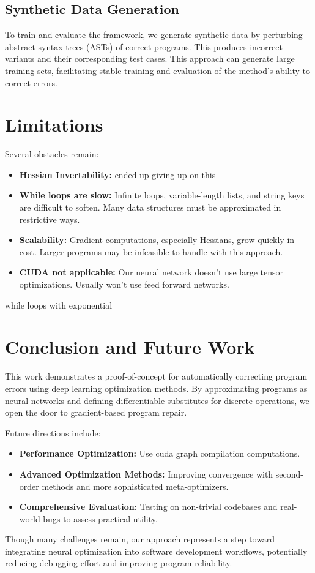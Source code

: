 \documentclass{article}
\begin{document}
\subsection{Synthetic Data Generation}
To train and evaluate the framework, we generate synthetic data by perturbing abstract syntax trees (ASTs) of correct programs. This produces incorrect variants and their corresponding test cases. This approach can generate large training sets, facilitating stable training and evaluation of the method’s ability to correct errors.


\section{Limitations}
Several obstacles remain:
\begin{itemize}
    \item \textbf{Hessian Invertability:} ended up giving up on this
    \item \textbf{While loops are slow:} Infinite loops, variable-length lists, and string keys are difficult to soften. Many data structures must be approximated in restrictive ways.
    \item \textbf{Scalability:} Gradient computations, especially Hessians, grow quickly in cost. Larger programs may be infeasible to handle with this approach.
    \item \textbf{CUDA not applicable:} Our neural network doesn't use large tensor optimizations. Usually won't use feed forward networks.
\end{itemize}

while loops with exponential

\section{Conclusion and Future Work}
This work demonstrates a proof-of-concept for automatically correcting program errors using deep learning optimization methods. By approximating programs as neural networks and defining differentiable substitutes for discrete operations, we open the door to gradient-based program repair.

Future directions include:
\begin{itemize}
    \item \textbf{Performance Optimization:} Use cuda graph compilation computations.
    \item \textbf{Advanced Optimization Methods:} Improving convergence with second-order methods and more sophisticated meta-optimizers.
    \item \textbf{Comprehensive Evaluation:} Testing on non-trivial codebases and real-world bugs to assess practical utility.
\end{itemize}

Though many challenges remain, our approach represents a step toward integrating neural optimization into software development workflows, potentially reducing debugging effort and improving program reliability.



\end{document}
